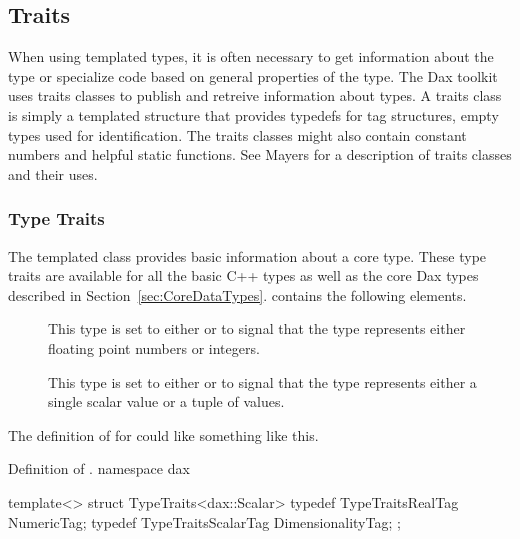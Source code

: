 \subsection{Traits}
\label{sec:Traits}


When using templated types, it is often necessary to get information about
the type or specialize code based on general properties of the type. The
Dax toolkit uses traits classes to publish and retreive information about
types. A traits class is simply a templated structure that provides
typedefs for tag structures, empty types used for
identification. The traits classes might also contain constant numbers and
helpful static functions. See Mayers for a description of
traits classes and their uses.

\subsubsection{Type Traits}

The  templated class provides basic information
about a core type. These type traits are available for all the basic C++
types as well as the core Dax types described in
Section~\ref{sec:CoreDataTypes}.  contains the following
elements.

\begin{description}
\item[]  This type is set to
  either  or  to signal
  that the type represents either floating point numbers or integers.
\item[]  This
  type is set to either  or
   to signal that the type represents either a
  single scalar value or a tuple of values.
\end{description}

The definition of  for  could like something
like this.
\begin{daxexample}{Definition of \protect {}.}
namespace dax {

template<>
struct TypeTraits<dax::Scalar>
{
  typedef TypeTraitsRealTag NumericTag;
  typedef TypeTraitsScalarTag DimensionalityTag;
};

}
\end{daxexample}

